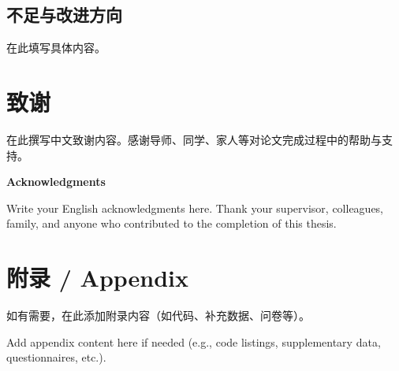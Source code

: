 \documentclass[a4paper,12pt,oneside]{ctexart}
\begin{document}
\subsection{不足与改进方向}
在此填写具体内容。






\section*{致\quad 谢}

在此撰写中文致谢内容。感谢导师、同学、家人等对论文完成过程中的帮助与支持。

\vspace{1cm}
\begin{center}
{\large \textbf{Acknowledgments}}
\end{center}
\vspace{0.3cm}

Write your English acknowledgments here. Thank your supervisor, colleagues, family, and anyone who contributed to the completion of this thesis.

\appendix
\section{附录 / Appendix}
如有需要，在此添加附录内容（如代码、补充数据、问卷等）。

Add appendix content here if needed (e.g., code listings, supplementary data, questionnaires, etc.).

\end{document}
